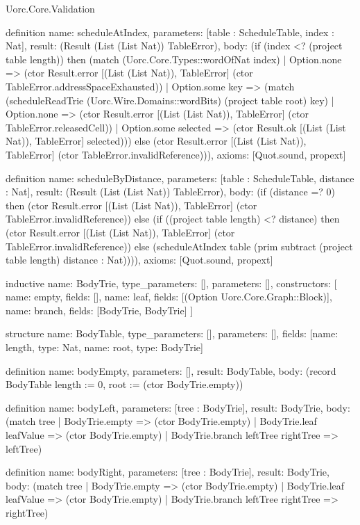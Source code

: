 \begin{lexlean}{Uorc.Core.Validation}
\begin{semanticmodule}
definition{
  name: scheduleAtIndex,
  parameters: [table : ScheduleTable, index : Nat],
  result: (Result (List (List Nat)) TableError),
  body: (if (index <? (project table length)) then (match (Uorc.Core.Types::wordOfNat index)
    | Option.none => (ctor Result.error [(List (List Nat)), TableError] (ctor TableError.addressSpaceExhausted))
    | Option.some key => (match (scheduleReadTrie (Uorc.Wire.Domains::wordBits) (project table root) key)
      | Option.none => (ctor Result.error [(List (List Nat)), TableError] (ctor TableError.releasedCell))
      | Option.some selected => (ctor Result.ok [(List (List Nat)), TableError] selected))) else (ctor Result.error [(List (List Nat)), TableError] (ctor TableError.invalidReference))),
  axioms: [Quot.sound, propext]
}

definition{
  name: scheduleByDistance,
  parameters: [table : ScheduleTable, distance : Nat],
  result: (Result (List (List Nat)) TableError),
  body: (if (distance =? 0) then (ctor Result.error [(List (List Nat)), TableError] (ctor TableError.invalidReference)) else (if ((project table length) <? distance) then (ctor Result.error [(List (List Nat)), TableError] (ctor TableError.invalidReference)) else (scheduleAtIndex table (prim subtract (project table length) distance : Nat)))),
  axioms: [Quot.sound, propext]
}

inductive{
  name: BodyTrie,
  type_parameters: [],
  parameters: [],
  constructors: [
    {name: empty, fields: []},
    {name: leaf, fields: [(Option Uorc.Core.Graph::Block)]},
    {name: branch, fields: [BodyTrie, BodyTrie]}
  ]
}

structure{
  name: BodyTable,
  type_parameters: [],
  parameters: [],
  fields: [{name: length, type: Nat}, {name: root, type: BodyTrie}]
}

definition{
  name: bodyEmpty,
  parameters: [],
  result: BodyTable,
  body: (record BodyTable {length := 0, root := (ctor BodyTrie.empty)})
}

definition{
  name: bodyLeft,
  parameters: [tree : BodyTrie],
  result: BodyTrie,
  body: (match tree
    | BodyTrie.empty => (ctor BodyTrie.empty)
    | BodyTrie.leaf leafValue => (ctor BodyTrie.empty)
    | BodyTrie.branch leftTree rightTree => leftTree)
}

definition{
  name: bodyRight,
  parameters: [tree : BodyTrie],
  result: BodyTrie,
  body: (match tree
    | BodyTrie.empty => (ctor BodyTrie.empty)
    | BodyTrie.leaf leafValue => (ctor BodyTrie.empty)
    | BodyTrie.branch leftTree rightTree => rightTree)
}


\end{semanticmodule}
\end{lexlean}

